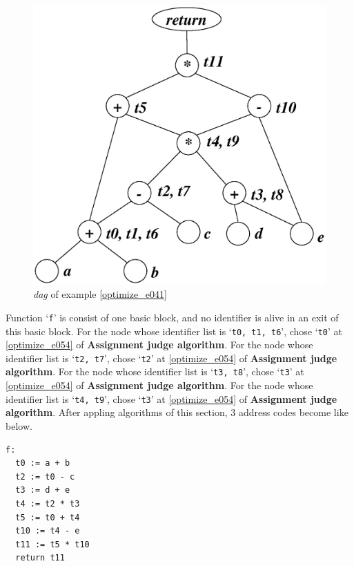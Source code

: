 \begin{Example}
\begin{figure}[htbp]
\begin{center}
\begin{latexonly}
\includegraphics[width=1.051\linewidth,height=1.0\linewidth]{opt022.eps}
\end{latexonly}
\caption{{\em dag} of example \ref{optimize_e041}}
\label{optimize_e042}
\end{center}
\end{figure}
Function `{\tt{f}}' is consist of one basic block, and 
no identifier is alive in an exit of this basic block.
For the node whose identifier list is `{\tt{t0, t1, t6}}',
chose `{\tt{t0}}' at \ref{optimize_e054}
of {\bf Assignment judge algorithm}.
For the node whose identifier list is `{\tt{t2, t7}}',
chose `{\tt{t2}}' at \ref{optimize_e054}
of {\bf Assignment judge algorithm}.
For the node whose identifier list is `{\tt{t3, t8}}',
chose `{\tt{t3}}' at \ref{optimize_e054}
of {\bf Assignment judge algorithm}.
For the node whose identifier list is `{\tt{t4, t9}}',
chose `{\tt{t3}}' at \ref{optimize_e054}
of {\bf Assignment judge algorithm}.
After appling algorithms of this section,
3 address codes become like below.
\begin{verbatim}
f:
  t0 := a + b
  t2 := t0 - c
  t3 := d + e
  t4 := t2 * t3
  t5 := t0 + t4
  t10 := t4 - e
  t11 := t5 * t10
  return t11
\end{verbatim}
\end{Example}

